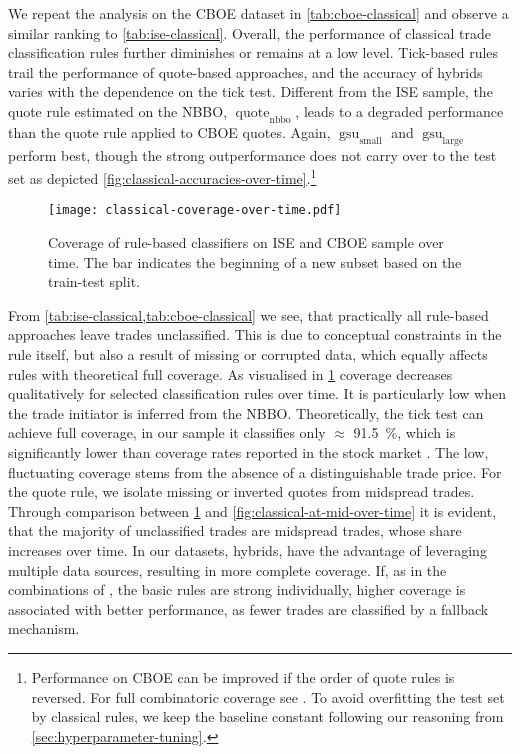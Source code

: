 We repeat the analysis on the \gls{CBOE} dataset in \cref{tab:cboe-classical} and observe a similar ranking to \cref{tab:ise-classical}. Overall, the performance of classical trade classification rules further diminishes or remains at a low level. Tick-based rules trail the performance of quote-based approaches, and the accuracy of hybrids varies with the dependence on the tick test. Different from the \gls{ISE} sample, the quote rule estimated on the \gls{NBBO}, $\operatorname{quote}_{\mathrm{nbbo}}$, leads to a degraded performance than the quote rule applied to \gls{CBOE} quotes. Again, $\operatorname{gsu}_{\mathrm{small}}$ and $\operatorname{gsu}_{\mathrm{large}}$ perform best, though the strong outperformance does not carry over to the test set as depicted \cref{fig:classical-accuracies-over-time}.\footnote{Performance on \gls{CBOE} can be improved if the order of quote rules is reversed. For full combinatoric coverage see \textcite[][33]{grauerOptionTradeClassification2022}. To avoid overfitting the test set by classical rules, we keep the baseline constant following our reasoning from \cref{sec:hyperparameter-tuning}.}

\begin{figure}[!h]
    \centering
    \texttt{[image: classical-coverage-over-time.pdf]}
    \caption[Coverage of Rule-Based Classifiers Over Time]{Coverage of rule-based classifiers on \gls{ISE} and \gls{CBOE} sample over time. The bar \myline{} indicates the beginning of a new subset based on the train-test split.}
    \label{fig:classical-coverage-over-time}
\end{figure}

From \cref{tab:ise-classical,tab:cboe-classical} we see, that practically all rule-based approaches leave trades unclassified. This is due to conceptual constraints in the rule itself, but also a result of missing or corrupted data, which equally affects rules with theoretical full coverage. As visualised in \cref{fig:classical-coverage-over-time} coverage decreases qualitatively for selected classification rules over time. It is particularly low when the trade initiator is inferred from the \gls{NBBO}. Theoretically, the tick test can achieve full coverage, in our sample it classifies only $\approx$ \SI{91.5}{\percent}, which is significantly lower than coverage rates reported in the stock market \autocite[][535]{ellisAccuracyTradeClassification2000}. The low, fluctuating coverage stems from the absence of a distinguishable trade price. For the quote rule, we isolate missing or inverted quotes from midspread trades. Through comparison between \cref{fig:classical-coverage-over-time} and \cref{fig:classical-at-mid-over-time} it is evident, that the majority of unclassified trades are midspread trades, whose share increases over time. In our datasets, hybrids, have the advantage of leveraging multiple data sources, resulting in more complete coverage. If, as in the combinations of \textcite[][18--19]{grauerOptionTradeClassification2022}, the basic rules are strong individually, higher coverage is associated with better performance, as fewer trades are classified by a fallback mechanism.

